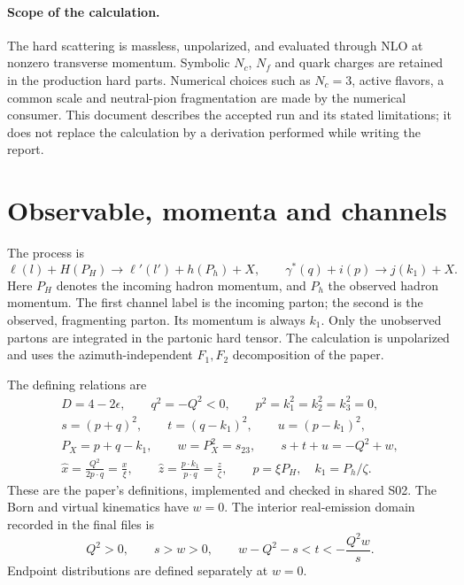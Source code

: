 \documentclass[11pt,a4paper]{article}
\newcommand{\eps}{\epsilon}
\begin{document}
\paragraph{Scope of the calculation.}
The hard scattering is massless, unpolarized, and evaluated through NLO
at nonzero transverse momentum. Symbolic $N_c$, $N_f$ and quark charges
are retained in the production hard parts. Numerical choices such as
$N_c=3$, active flavors, a common scale and neutral-pion fragmentation
are made by the numerical consumer. This document describes the
accepted run and its stated limitations; it does not replace the
calculation by a derivation performed while writing the report.

\clearpage
\tableofcontents
\clearpage

\section{Observable, momenta and channels}
\label{sec:observable}

The process is
\begin{equation}
 \ell(l)+H(P_H)\longrightarrow \ell'(l')+h(P_h)+X,
 \qquad
 \gamma^*(q)+i(p)\longrightarrow j(k_1)+X.
\end{equation}
Here $P_H$ denotes the incoming hadron momentum, and $P_h$ the observed
hadron momentum. The first channel label is the incoming parton; the second
is the observed, fragmenting parton. Its momentum is always $k_1$.
Only the unobserved partons are integrated in the partonic hard tensor.
The calculation is unpolarized and uses the azimuth-independent $F_1,F_2$
decomposition of the paper.

The defining relations are
\begin{gather}
 D=4-2\eps,\qquad q^2=-Q^2<0,\qquad p^2=k_1^2=k_2^2=k_3^2=0,
 \label{eq:dimension}\\
 s=(p+q)^2,\qquad t=(q-k_1)^2,\qquad u=(p-k_1)^2,\\
 P_X=p+q-k_1,\qquad w=P_X^2=s_{23},\qquad
 s+t+u=-Q^2+w,\label{eq:invariants}\\
 \hat x=\frac{Q^2}{2p\cdot q}=\frac{x}{\xi},\qquad
 \hat z=\frac{p\cdot k_1}{p\cdot q}=\frac{z}{\zeta},\qquad
 p=\xi P_H,\quad k_1=P_h/\zeta.
\end{gather}
These are the paper's definitions, implemented and checked in shared S02.
The Born and virtual kinematics have $w=0$. The interior real-emission
domain recorded in the final files is
\begin{equation}
 Q^2>0,\qquad s>w>0,\qquad
 w-Q^2-s<t<-\frac{Q^2w}{s}.
 \label{eq:support}
\end{equation}
Endpoint distributions are defined separately at $w=0$.
\end{document}
